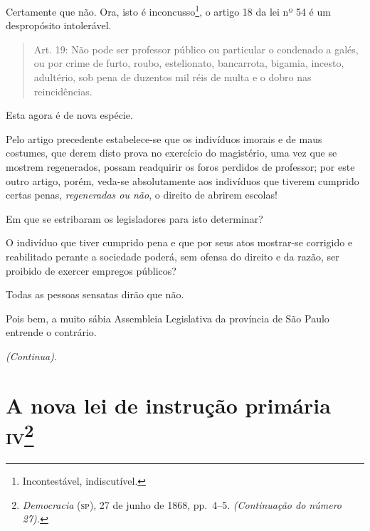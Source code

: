 Certamente que não. Ora, isto é inconcusso\footnote{Incontestável,
  indiscutível.}, o artigo 18 da lei nº 54 é um despropósito
intolerável.

\begin{quote}
Art. 19: Não pode ser professor público ou particular o condenado a
galés, ou por crime de furto, roubo, estelionato, bancarrota, bigamia,
incesto, adultério, sob pena de duzentos mil réis de multa e o dobro nas
reincidências.
\end{quote}

Esta agora é de nova espécie.

Pelo artigo precedente estabelece-se que os indivíduos imorais e de maus
costumes, que derem disto prova no exercício do magistério, uma vez que
se mostrem regenerados, possam readquirir os foros perdidos de
professor; por este outro artigo, porém, veda-se absolutamente aos
indivíduos que tiverem cumprido certas penas, \emph{regeneradas ou não},
o direito de abrirem escolas!

Em que se estribaram os legisladores para isto determinar?

O indivíduo que tiver cumprido pena e que por seus atos mostrar-se
corrigido e reabilitado perante a sociedade poderá, sem ofensa do
direito e da razão, ser proibido de exercer empregos públicos?

Todas as pessoas sensatas dirão que não.

Pois bem, a muito sábia Assembleia Legislativa da província de São Paulo
entrende o contrário.

\emph{(Continua)}.

\chapter{A nova lei de instrução primária \textsc{iv}\footnote{\emph{Democracia} (\textsc{sp}), 27 de junho de 1868, pp.~4--5. \emph{(Continuação do
  número 27).}}}

